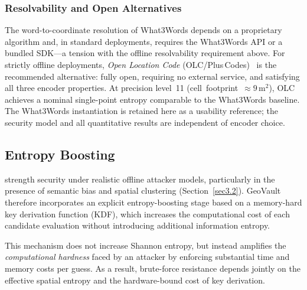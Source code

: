 \documentclass[mathematics,article,accept,pdftex,moreauthors]{Definitions/mdpi}
\begin{document}
\subsubsection{ Resolvability and Open Alternatives} 
{The word-to-coordinate resolution of What3Words depends on a proprietary algorithm and, in standard deployments, requires the What3Words API or a bundled SDK---a tension with the offline resolvability requirement above. For strictly offline deployments, \emph{Open Location Code} (OLC/Plus\,Codes)~\cite{Mai2022} is the recommended alternative: fully open, requiring no external service, and satisfying all three encoder properties. At precision level~11 \mbox{(cell footprint $\approx 9\,\mathrm{m}^2$)}, OLC achieves a nominal single-point entropy comparable to the What3Words baseline. The What3Words instantiation is retained here as a usability reference; the security model and all quantitative results are independent of encoder choice.}

\subsection{Entropy Boosting}
\label{sec:entropy_boosting}

strength security under realistic offline attacker models, particularly in the presence of semantic bias and spatial clustering (Section~\ref{sec3.2}). GeoVault therefore incorporates an explicit entropy-boosting stage based on a memory-hard key derivation function (KDF), which increases the computational cost of each candidate evaluation without introducing additional information entropy.

This mechanism does not increase Shannon entropy, but instead amplifies the \emph{computational hardness} faced by an attacker by enforcing substantial time and memory costs per guess. As a result, brute-force resistance depends jointly on the effective spatial entropy and the hardware-bound cost of key derivation.
\end{document}
